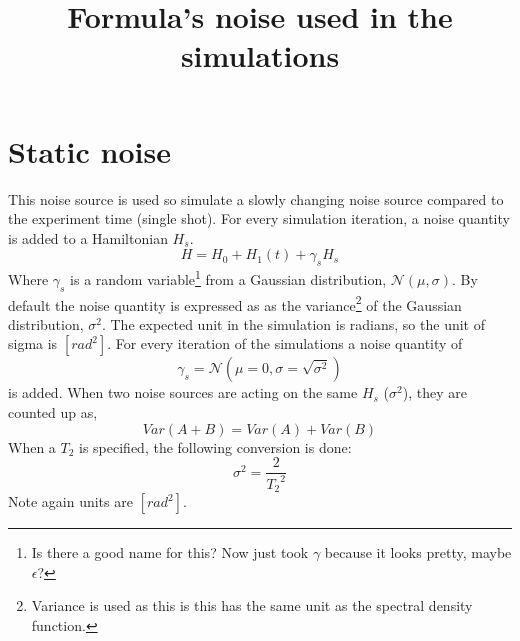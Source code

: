 \documentclass{paper}
\title{Formula's noise used in the simulations}
\begin{document}
\section{Static noise} %
\label{sec:static_noise}
This noise source is used so simulate a slowly changing noise source compared to the experiment time (single shot). For every simulation iteration, a noise quantity is added to a Hamiltonian $H_s$.
\begin{equation}
	H = H_0 + H_1(t) + \gamma_s H_s
\end{equation}
Where $\gamma_s$ is a random variable\footnote{\color{blue}Is there a good name for this? Now just took $\gamma$ because it looks pretty, maybe $\epsilon$?} from a Gaussian distribution, $\mathcal{N}(\mu, \sigma)$. By default the noise quantity is expressed as as the variance\footnote{Variance is used as this is this has the same unit as the spectral density function.} of the Gaussian distribution, $\sigma^2$. The expected unit in the simulation is radians, so the unit of sigma is $[rad^2]$. For every iteration of the simulations a noise quantity of 
\begin{equation}
	\gamma_s = \mathcal{N}(\mu = 0,\sigma=\sqrt{\sigma^2})
\end{equation}
is added. When two noise sources are acting on the same $H_s$ ($\sigma^2$), they are counted up as,
\begin{equation}
	Var(A + B) = Var(A) + Var(B)
\end{equation}
When a $T_2$ is specified, the following conversion is done:
\begin{equation}
	\sigma^2 = \frac{2}{{T_2}^2}
\end{equation}
Note again units are $[rad^2]$.
\end{document}
